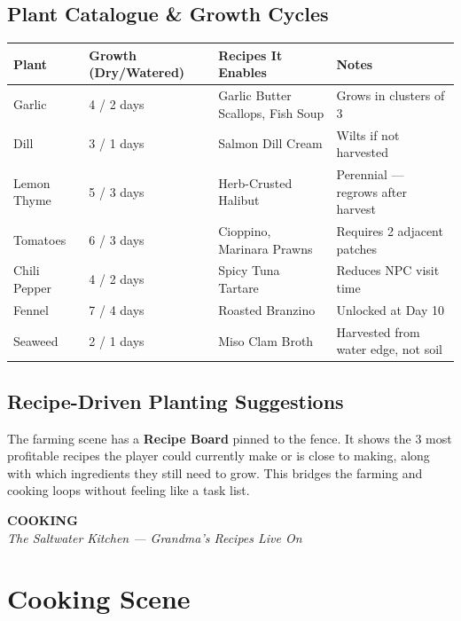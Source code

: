 \documentclass[11pt, letterpaper]{article}
\newcommand{\sectionband}[3]{%
  \begin{tcolorbox}[
    enhanced,
    colback=#3, colframe=#3,
    boxrule=0pt, arc=0pt,
    left=12pt, right=12pt, top=10pt, bottom=10pt,
    beforeafter skip=14pt,
  ]
    {\Large\bfseries\color{white}#1}\\[2pt]
    {\small\itshape\color{#3!30!white}#2}
  \end{tcolorbox}%
}
\newcommand{\altrow}{\rowcolor{rowalt}}
\begin{document}
\subsection{Plant Catalogue \& Growth Cycles}

\vspace{4pt}
\begin{tabularx}{\textwidth}{L{2.6cm} L{3cm} L{4.4cm} L{3.2cm}}
\toprule
{}
\textbf{\color{white}Plant} & \textbf{\color{white}Growth (Dry/Watered)} & \textbf{\color{white}Recipes It Enables} & \textbf{\color{white}Notes} \\
\midrule
Garlic       & 4 / 2 days & Garlic Butter Scallops, Fish Soup  & Grows in clusters of 3 \\
\altrow
Dill         & 3 / 1 days & Salmon Dill Cream                  & Wilts if not harvested \\
Lemon Thyme  & 5 / 3 days & Herb-Crusted Halibut               & Perennial --- regrows after harvest \\
\altrow
Tomatoes     & 6 / 3 days & Cioppino, Marinara Prawns          & Requires 2 adjacent patches \\
Chili Pepper & 4 / 2 days & Spicy Tuna Tartare                 & Reduces NPC visit time \\
\altrow
Fennel       & 7 / 4 days & Roasted Branzino                   & Unlocked at Day 10 \\
Seaweed      & 2 / 1 days & Miso Clam Broth                    & Harvested from water edge, not soil \\
\bottomrule
\end{tabularx}

\subsection{Recipe-Driven Planting Suggestions}

The farming scene has a \textbf{Recipe Board} pinned to the fence. It shows the 3 most profitable recipes the player could currently make or is close to making, along with which ingredients they still need to grow. This bridges the farming and cooking loops without feeling like a task list.

\newpage
\sectionband{COOKING}{The Saltwater Kitchen --- Grandma's Recipes Live On}{gold}
\section{Cooking Scene}
\end{document}

